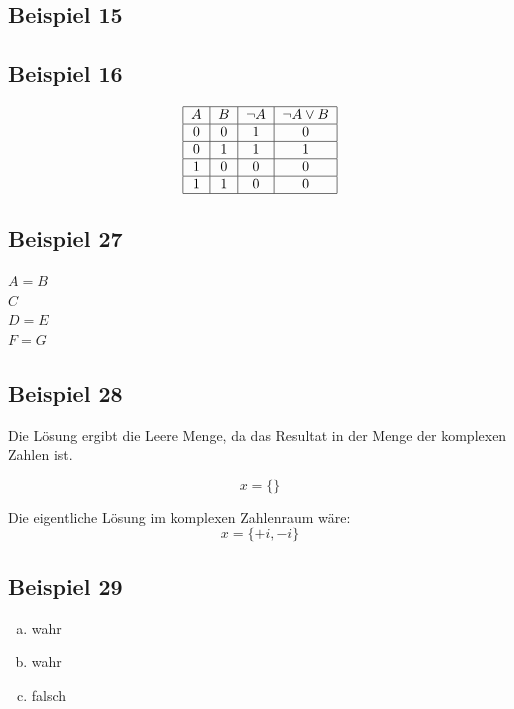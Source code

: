 \documentclass[12pt, a4paper, oneside]{article}
\begin{document}
\subsection{Beispiel 15}

\subsection{Beispiel 16}
\begin{equation}
  \begin{tabular}{|c|c|c|c|}
    \hline
    $A$ & $B$ & $\lnot A$ & $\lnot A \lor B$ \\ \hline
    0 & 0 & 1 & 0 \\ \hline
    0 & 1 & 1 & 1 \\ \hline
    1 & 0 & 0 & 0 \\ \hline
    1 & 1 & 0 & 0 \\ \hline
  \end{tabular}
\end{equation}

\subsection{Beispiel 27}
$A = B$ \\
$C$ \\
$D = E$ \\
$F = G$

\subsection{Beispiel 28}
Die Lösung ergibt die Leere Menge, da das Resultat in der Menge der komplexen Zahlen ist.

\begin{equation}
  x = \{\}
\end{equation}

Die eigentliche Lösung im komplexen Zahlenraum wäre:
\begin{equation}
  x = \{+i, -i\}
\end{equation}

\subsection{Beispiel 29}
\begin{enumerate}[a)]
  \item wahr
  \item wahr
  \item falsch
\end{enumerate}
\end{document}
